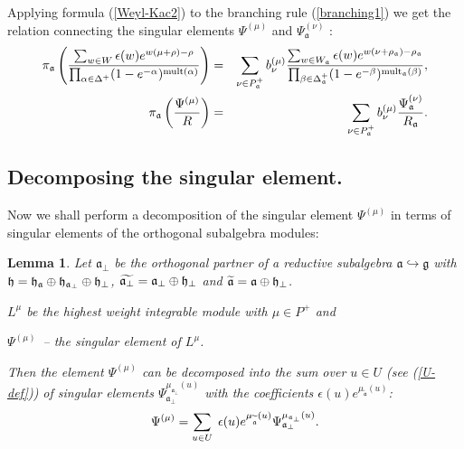 \documentclass[12pt]{article}
\newtheorem{lemma}{Lemma}
\theoremstyle{definition}
\newcommand{\gf}{\mathfrak{g}}
\newcommand{\af}{\mathfrak{a}}
\newcommand{\afb}{\mathfrak{a}_{\bot}}
\begin{document}
Applying formula (\ref{Weyl-Kac2}) to the branching rule (\ref{branching1})
we get the relation connecting the singular elements $\Psi ^{\left( \mu
\right) }$ and $\Psi _{\af}^{\left( \nu \right) }$ :
\begin{eqnarray}
\pi _{\af}\left( \frac{\sum_{w \in W}\epsilon (w )e^{w (\mu +\rho
)-\rho }}{\prod_{\alpha \in \Delta ^{+}}(1-e^{-\alpha })^{\mathrm{mult}%
(\alpha )}}\right) &=&\sum_{\nu \in P_{\af}^{+}}b_{\nu }^{(\mu )}\frac{%
\sum_{w \in W_{\af}}\epsilon (w )e^{w (\nu +\rho _{\af})-\rho _{%
\af}}}{\prod_{\beta \in \Delta _{\af}^{+}}(1-e^{-\beta })^{\mathrm{%
mult}_{\af}(\beta )}},  \notag  \label{eq:4} \\
\pi _{\af}\left( \frac{\Psi ^{\left( \mu \right) }}{R}\right)
&=&\sum_{\nu \in P_{\af}^{+}}b_{\nu }^{(\mu )}\frac{\Psi _{\af%
}^{\left( \nu \right) }}{R_{\af}}.
\end{eqnarray}

\subsection{Decomposing the singular element.}

\label{subsec:decomp-sing-element}

Now we shall perform a decomposition of the singular element $\Psi ^{\left(
\mu \right) }$ in terms of singular elements of the orthogonal subalgebra
modules:

\begin{lemma}
Let $\af_{\bot }$ be the orthogonal partner of a reductive subalgebra $%
\af\hookrightarrow \gf$ with $\frak{h}=\frak{\frak{h}_{\af}}%
\oplus \frak{h}_{\afb}\oplus \frak{h}_{\perp }$, $\widetilde{%
\afb}=\afb\oplus \frak{h}_{\perp }$ and $%
\widetilde{\af}=\af\oplus \frak{h}_{\perp }$.

$L^{\mu }$ be the highest weight integrable module with $\mu \in P^{+}$ and

$\Psi ^{\left( \mu \right) }$\ -- the singular element of $L^{\mu }$.

Then the element $\Psi ^{\left( \mu \right) }$ can be decomposed into the
sum over $u\in U$ (see (\ref{U-def})) of singular elements $\Psi _{\af%
_{\perp }}^{\mu _{\afb}\left( u\right) }$ with the coefficients
$\epsilon (u)e^{\mu _{\widetilde{\mathfrak{a}}}\left( u\right) }$:
\begin{equation}
\Psi ^{\left( \mu \right) }=\sum_{u\in U}\;\epsilon (u)e^{\mu _{\widetilde{%
\mathfrak{a}}}\left( u\right) }\Psi _{\afb}^{\mu _{\af%
_{\perp }}\left( u\right) }.  \label{sing decomp main}
\end{equation}
\end{lemma}
\end{document}
